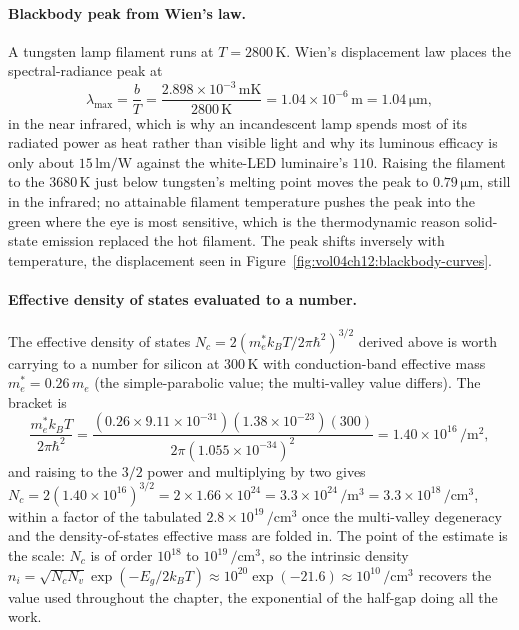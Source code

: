 \paragraph{Blackbody peak from Wien's law.}
A tungsten lamp filament runs at $T = 2800\,\si{\kelvin}$. Wien's
displacement law places the spectral-radiance peak at
\[
\lambda_{\max} = \frac{b}{T}
              = \frac{2.898\times 10^{-3}\,\si{\meter\kelvin}}
                     {2800\,\si{\kelvin}}
              = 1.04\times 10^{-6}\,\si{\meter}
              = 1.04\,\si{\micro\meter},
\]
in the near infrared, which is why an incandescent lamp spends most of
its radiated power as heat rather than visible light and why its
luminous efficacy is only about $15\,\si{\lumen\per\watt}$ against the
white-LED luminaire's $110$. Raising the filament to the $3680\,\si{
\kelvin}$ just below tungsten's melting point moves the peak to
$0.79\,\si{\micro\meter}$, still in the infrared; no attainable filament
temperature pushes the peak into the green where the eye is most
sensitive, which is the thermodynamic reason solid-state emission
replaced the hot filament. The peak shifts inversely with temperature,
the displacement seen in Figure~\ref{fig:vol04ch12:blackbody-curves}.

\paragraph{Effective density of states evaluated to a number.}
The effective density of states $N_c = 2(m^{*}_e k_B T/2\pi\hbar^{2})^{
3/2}$ derived above is worth carrying to a number for silicon at
$300\,\si{\kelvin}$ with conduction-band effective mass $m^{*}_e =
0.26\,m_e$ (the simple-parabolic value; the multi-valley value differs).
The bracket is
\[
\frac{m^{*}_e k_B T}{2\pi\hbar^{2}}
 = \frac{(0.26\times 9.11\times 10^{-31})(1.38\times 10^{-23})(300)}
        {2\pi(1.055\times 10^{-34})^{2}}
 = 1.40\times 10^{16}\,\si{\per\meter\squared},
\]
and raising to the $3/2$ power and multiplying by two gives $N_c =
2(1.40\times 10^{16})^{3/2} = 2\times 1.66\times 10^{24} = 3.3\times
10^{24}\,\si{\per\meter\cubed} = 3.3\times 10^{18}\,\si{\per\centi
\meter\cubed}$, within a factor of the tabulated $2.8\times 10^{19}\,\si{
\per\centi\meter\cubed}$ once the multi-valley degeneracy and the
density-of-states effective mass are folded in. The point of the estimate
is the scale: $N_c$ is of order $10^{18}$ to $10^{19}\,\si{\per\centi
\meter\cubed}$, so the intrinsic density $n_i = \sqrt{N_c N_v}\exp(-E_g/
2k_B T) \approx 10^{20}\exp(-21.6) \approx 10^{10}\,\si{\per\centi\meter
\cubed}$ recovers the value used throughout the chapter, the exponential
of the half-gap doing all the work.

